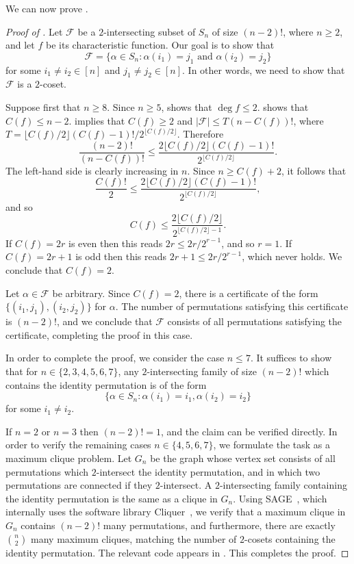 \documentclass{article}
\theoremstyle{definition}
\begin{document}
We can now prove .

\begin{proof}[Proof of ]
Let $\mathcal{F}$ be a $2$-intersecting subset of $S_n$ of size $(n-2)!$, where $n \geq 2$, and let $f$ be its characteristic function. Our goal is to show that
\[
 \mathcal{F} = \{ \alpha \in S_n : \alpha(i_1) = j_1 \text{ and } \alpha(i_2) = j_2 \}
\]
for some $i_1 \neq i_2 \in [n]$ and $j_1 \neq j_2 \in [n]$. In other words, we need to show that $\mathcal{F}$ is a $2$-coset.

Suppose first that $n \geq 8$. Since $n \geq 5$,  shows that $\deg f \leq 2$.  shows that $C(f) \leq n-2$.  implies that $C(f) \geq 2$ and $|\mathcal{F}| \leq T (n - C(f))!$, where $T = \lfloor C(f)/2 \rfloor (C(f) - 1)!/2^{\lfloor C(f)/2 \rfloor}$. Therefore
\[
 \frac{(n-2)!}{(n - C(f))!} \leq \frac{2\lfloor C(f)/2 \rfloor (C(f) - 1)!}{2^{\lfloor C(f)/2 \rfloor}}.
\]
The left-hand side is clearly increasing in $n$. Since $n \geq C(f) + 2$, it follows that
\[
 \frac{C(f)!}{2} \leq \frac{2\lfloor C(f)/2 \rfloor (C(f) - 1)!}{2^{\lfloor C(f)/2 \rfloor}},
\]
and so
\[
 C(f) \leq \frac{2 \lfloor C(f)/2 \rfloor}{2^{\lfloor C(f)/2 \rfloor - 1}}.
\]
If $C(f) = 2r$ is even then this reads $2r \leq 2r/2^{r-1}$, and so $r = 1$. If $C(f) = 2r+1$ is odd then this reads $2r+1 \leq 2r/2^{r-1}$, which never holds. We conclude that $C(f) = 2$.

Let $\alpha \in \mathcal{F}$ be arbitrary. Since $C(f) = 2$, there is a certificate of the form $\{(i_1,j_1),(i_2,j_2)\}$ for $\alpha$. The number of permutations satisfying this certificate is $(n-2)!$, and we conclude that $\mathcal{F}$ consists of all permutations satisfying the certificate, completing the proof in this case.

\smallskip

In order to complete the proof, we consider the case $n \leq 7$. It suffices to show that for $n \in \{2,3,4,5,6,7\}$, any $2$-intersecting family of size $(n-2)!$ which contains the identity permutation is of the form
\[
 \{ \alpha \in S_n : \alpha(i_1) = i_1, \alpha(i_2) = i_2 \}
\]
for some $i_1 \neq i_2$.

If $n = 2$ or $n = 3$ then $(n-2)! = 1$, and the claim can be verified directly. In order to verify the remaining cases $n \in \{4,5,6,7\}$, we formulate the task as a maximum clique problem. Let $G_n$ be the graph whose vertex set consists of all permutations which $2$-intersect the identity permutation, and in which two permutations are connected if they $2$-intersect. A $2$-intersecting family containing the identity permutation is the same as a clique in $G_n$. Using SAGE~\cite{sagemath}, which internally uses the software library Cliquer~\cite{Cliquer}, we verify that a maximum clique in $G_n$ contains $(n-2)!$ many permutations, and furthermore, there are exactly $\binom{n}{2}$ many maximum cliques, matching the number of $2$-cosets containing the identity permutation. The relevant code appears in . This completes the proof.
\end{proof}
\end{document}
